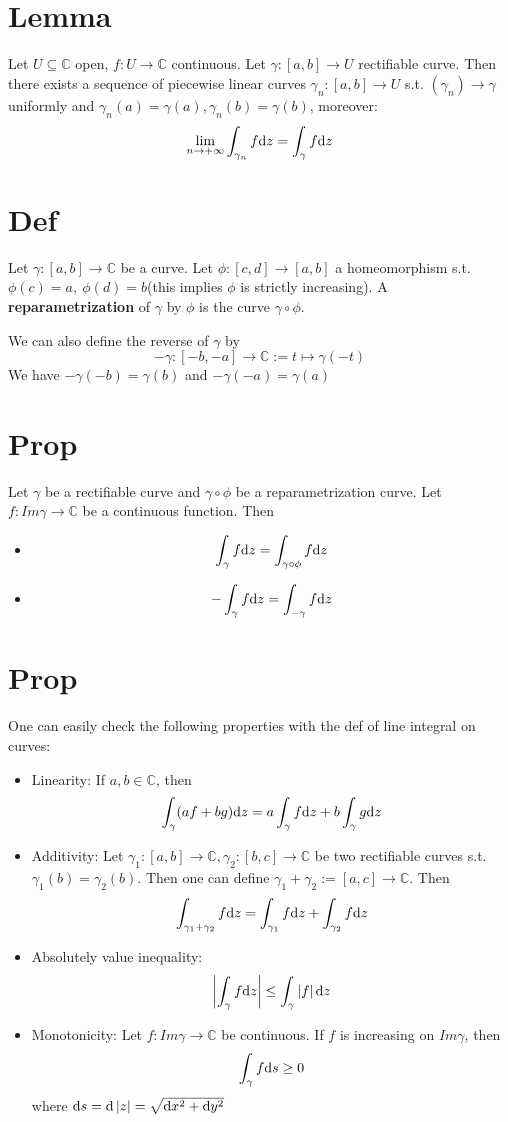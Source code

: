 \documentclass{book}
\newcommand{\abs}[1]{\left\lvert #1 \right\rvert}
\begin{document}
\section{Lemma}
\label{Lemma gamma integral converge}
Let $U\subseteq \mathbb C$ open, $f:U\to \mathbb C$ continuous. Let $\gamma:[a,b]\to U$ rectifiable curve. Then there exists a sequence of piecewise linear curves $\gamma_n:[a,b]\to U$ s.t. $(\gamma_n)\to \gamma$ uniformly and $\gamma_n(a)=\gamma(a),\gamma_n(b)=\gamma(b)$, moreover:
$$\lim\limits_{n\to +\infty}\int_{\gamma_n}f\text dz=\int_\gamma f\text dz$$
\section{Def}
Let $\gamma:[a,b]\to \mathbb C$ be a curve. Let $\phi:[c,d]\to[a,b]$ a homeomorphism s.t. $\phi(c)=a,\ \phi(d)=b$(this implies $\phi$ is strictly increasing). A \textbf{reparametrization} of $\gamma$ by $\phi$ is the curve $\gamma\circ \phi$. 

We can also define the reverse of $\gamma$ by $$-\gamma:[-b,-a]\to\mathbb C:=t\mapsto\gamma(-t)$$
We have $-\gamma(-b)=\gamma(b)$ and $-\gamma(-a)=\gamma(a)$

\section{Prop}
Let $\gamma$ be a rectifiable curve and $\gamma\circ \phi$ be a reparametrization curve. Let $f:Im\gamma\to\mathbb C$ be a continuous function. Then \begin{itemize}
    \item $$\int_\gamma f\text dz=\int_{\gamma\circ \phi}f\text dz$$
    \item $$-\int_\gamma f\text dz=\int_{-\gamma}f\text dz$$
\end{itemize}
\section{Prop}
One can easily check the following properties with the def of line integral on curves:
\begin{itemize}
    \item Linearity: If $a,b\in \mathbb C$, then $$\int_\gamma(af+bg)\text dz=a\int_\gamma f\text dz+b\int_\gamma g\text dz$$
    \item Additivity: Let $\gamma_1:[a,b]\to\mathbb C,\gamma_2:[b,c]\to\mathbb C$ be two rectifiable curves s.t. $\gamma_1(b)=\gamma_2(b)$. Then one can define $\gamma_1+\gamma_2:=[a,c]\to \mathbb C$. Then$$\int_{\gamma_1+\gamma_2}f\text dz=\int_{\gamma_1}f\text dz+\int_{\gamma_2}f\text dz$$
    \item Absolutely value inequality:$$\abs{\int_\gamma f\text dz}\leq\int_\gamma\abs{f}\text dz$$
    \item Monotonicity: Let $f:Im\gamma\to\mathbb C$ be continuous. If $f$ is increasing on $Im\gamma$, then $$\int_\gamma f\text ds\geq 0$$where $\text ds=\text d\abs z=\sqrt{\text dx^2+\text dy^2}$
\end{itemize}
\end{document}
